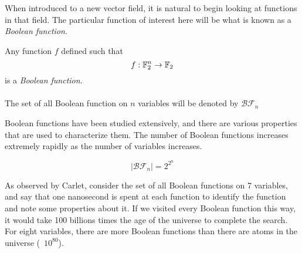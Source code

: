 \par When introduced to a new vector field, it is natural to begin looking at functions in
that field. The particular function of interest here will be what is known as a {\em Boolean function}.

\begin{definition}
\label{def:boolean-function}
  Any function $f$ defined such that 
  \begin{equation*}
    f:\mathbb{F}_2^n\rightarrow\mathbb{F}_2
  \end{equation*}
  is a {\em Boolean function}.\\
	\\
	The set of all Boolean function on $n$ variables will be denoted by $\mathcal{BF}_n$
\end{definition}

\par Boolean functions have been studied extensively, and there are various properties that
are used to characterize them. The number of Boolean functions increases extremely rapidly
as the number of variables increases.

\begin{equation}
  \lvert\mathcal{BF}_n\rvert = 2^{2^n}
\end{equation}

\par As observed by Carlet, consider the set of all Boolean functions on 7 variables,
and say that one nanosecond is spent at each function to identify the function and
note some properties about it. If we visited every Boolean function this way, it
would take 100 billions times the age of the universe to complete the search.
For eight variables, there are more Boolean functions than there are atoms in the
universe (~$10^{80}$).

